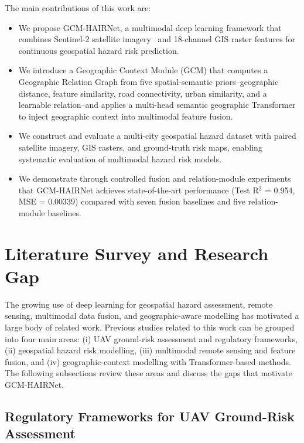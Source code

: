 \documentclass[sigconf, review=true]{acmart}
\begin{document}
The main contributions of this work are:
\begin{itemize}
  \item We propose GCM-HAIRNet, a multimodal deep learning framework that combines Sentinel-2 satellite imagery~\cite{drusch2012sentinel} and 18-channel GIS raster features for continuous geospatial hazard risk prediction.
  \item We introduce a Geographic Context Module (GCM) that computes a Geographic Relation Graph from five spatial-semantic priors--geographic distance, feature similarity, road connectivity, urban similarity, and a learnable relation--and applies a multi-head semantic geographic Transformer to inject geographic context into multimodal feature fusion.
  \item We construct and evaluate a multi-city geospatial hazard dataset with paired satellite imagery, GIS rasters, and ground-truth risk maps, enabling systematic evaluation of multimodal hazard risk models.
  \item We demonstrate through controlled fusion and relation-module experiments that GCM-HAIRNet achieves state-of-the-art performance (Test R$^2$ = 0.954, MSE = 0.00339) compared with seven fusion baselines and five relation-module baselines.
\end{itemize}

\section{Literature Survey and Research Gap}

The growing use of deep learning for geospatial hazard assessment, remote sensing, multimodal data fusion, and geographic-aware modelling has motivated a large body of related work. Previous studies related to this work can be grouped into four main areas: (i) UAV ground-risk assessment and regulatory frameworks, (ii) geospatial hazard risk modelling, (iii) multimodal remote sensing and feature fusion, and (iv) geographic-context modelling with Transformer-based methods. The following subsections review these areas and discuss the gaps that motivate GCM-HAIRNet.

\subsection{Regulatory Frameworks for UAV Ground-Risk Assessment}
\end{document}
